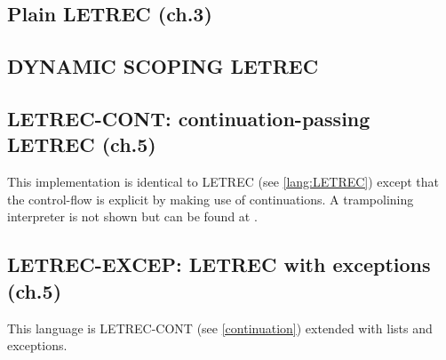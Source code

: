 \documentclass[../codeprint.tex]{subfiles}
\begin{document}
\subsection{Plain LETREC (ch.3)}
\label{lang:LETREC}



\subsection{DYNAMIC SCOPING LETREC}
\label{scoping}




\subsection{LETREC-CONT: continuation-passing LETREC (ch.5)}
\label{continuation}
This implementation is identical to LETREC (see \autoref{lang:LETREC}) except that the control-flow is explicit by making use of continuations. A trampolining interpreter is not shown but can be found at \cite[p.~155-166]{Friedman:2008:EPL:1378240}.


\subsection{LETREC-EXCEP: LETREC with exceptions (ch.5)}
This language is LETREC-CONT (see \autoref{continuation}) extended with lists and exceptions.


\end{document}
